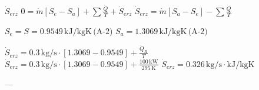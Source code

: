\( \dot{S}_{erz} \)  
\( 0 = \dot{m} [S_e - S_a] + \sum \frac{\dot{Q}}{T} + \dot{S}_{erz} \)  
\( \dot{S}_{erz} = \dot{m} [S_a - S_e] - \sum \frac{\dot{Q}}{T} \)  

\( S_e = S = 0.9549 \, \text{kJ/kgK} \, \text{(A-2)} \)  
\( S_a = 1.3069 \, \text{kJ/kgK} \, \text{(A-2)} \)  

\( \dot{S}_{erz} = 0.3 \, \text{kg/s} \cdot \left[ 1.3069 - 0.9549 \right] + \frac{\dot{Q}_R}{T} \)  
\( \dot{S}_{erz} = 0.3 \, \text{kg/s} \cdot \left[ 1.3069 - 0.9549 \right] + \frac{100 \, \text{kW}}{295 \, \text{K}} \)  
\( \dot{S}_{erz} = 0.326 \, \text{kg/s} \cdot \text{kJ/kgK} \)

---
